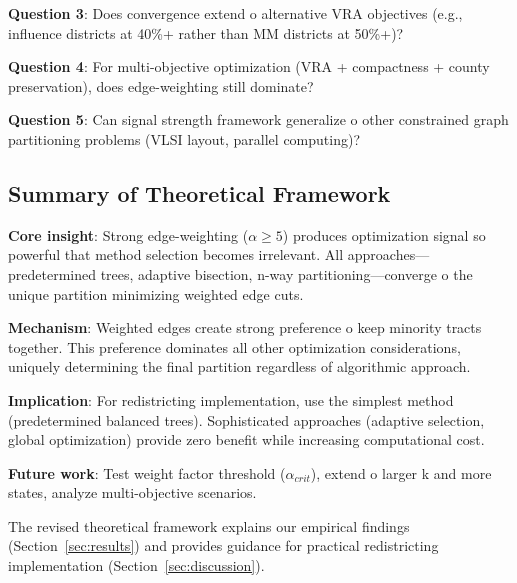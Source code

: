 \textbf{Question 3}: Does convergence extend 	o alternative VRA objectives (e.g., influence districts at 40\%+ rather than MM districts at 50\%+)?

\textbf{Question 4}: For multi-objective optimization (VRA + compactness + county preservation), does edge-weighting still dominate?

\textbf{Question 5}: Can signal strength framework generalize 	o other constrained graph partitioning problems (VLSI layout, parallel computing)?

\subsection{Summary of Theoretical Framework}

\textbf{Core insight}: Strong edge-weighting ($\alpha \geq 5$) produces optimization signal so powerful that method selection becomes irrelevant. All approaches—predetermined trees, adaptive bisection, n-way partitioning—converge 	o the unique partition minimizing weighted edge cuts.

\textbf{Mechanism}: Weighted edges create strong preference 	o keep minority tracts together. This preference dominates all other optimization considerations, uniquely determining the final partition regardless of algorithmic approach.

\textbf{Implication}: For redistricting implementation, use the simplest method (predetermined balanced trees). Sophisticated approaches (adaptive selection, global optimization) provide zero benefit while increasing computational cost.

\textbf{Future work}: Test weight factor threshold ($\alpha_{crit}$), extend 	o larger k and more states, analyze multi-objective scenarios.

The revised theoretical framework explains our empirical findings (Section~\ref{sec:results}) and provides guidance for practical redistricting implementation (Section~\ref{sec:discussion}).
